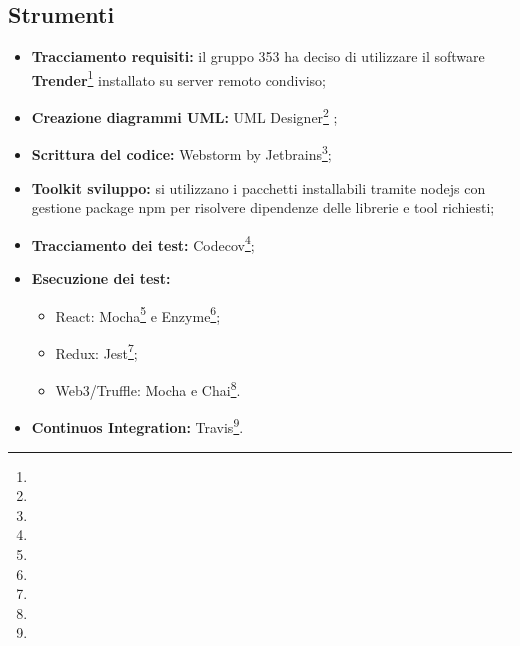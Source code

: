\documentclass[NormeDiProgetto.tex]{subfiles}
\begin{document}
\subsection{Strumenti}
\begin{itemize}
	\item \textbf{Tracciamento requisiti:} il gruppo 353 ha deciso di utilizzare il software \textbf{Trender}\footnote{} installato su server remoto condiviso;
	\item \textbf{Creazione diagrammi UML:} {UML Designer}\footnote{} ;
	\item \textbf{Scrittura del codice:} Webstorm by Jetbrains\footnote{}; 
	\item \textbf{Toolkit sviluppo:} si utilizzano i pacchetti installabili tramite nodejs con gestione package npm per risolvere dipendenze delle librerie e tool richiesti; %
	\item \textbf{Tracciamento dei test:} Codecov\footnote{}; %
	\item \textbf{Esecuzione dei test:}
	\begin{itemize}
		\item React: Mocha\footnote{} e Enzyme\footnote{};
		\item Redux: Jest\footnote{};
		\item Web3/Truffle: Mocha e Chai\footnote{}.
	\end{itemize}
	\item \textbf{Continuos Integration:} Travis\footnote{}. 	
\end{itemize}
\end{document}
